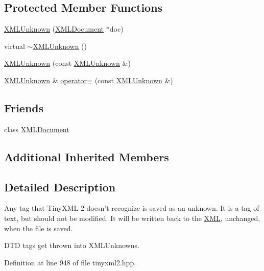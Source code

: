 \subsection*{Protected Member Functions}
\begin{DoxyCompactItemize}
\item 
\hyperlink{classtinyxml2_1_1_x_m_l_unknown_a9391eb679598d50baba424e6f1aa367b}{X\-M\-L\-Unknown} (\hyperlink{classtinyxml2_1_1_x_m_l_document}{X\-M\-L\-Document} $\ast$doc)
\item 
virtual \hyperlink{classtinyxml2_1_1_x_m_l_unknown_a86fcd722ca173a7f385bafafa879f26e}{$\sim$\-X\-M\-L\-Unknown} ()
\item 
\hyperlink{classtinyxml2_1_1_x_m_l_unknown_aab31a93c95a7cedc9597cea7caffa73f}{X\-M\-L\-Unknown} (const \hyperlink{classtinyxml2_1_1_x_m_l_unknown}{X\-M\-L\-Unknown} \&)
\item 
\hyperlink{classtinyxml2_1_1_x_m_l_unknown}{X\-M\-L\-Unknown} \& \hyperlink{classtinyxml2_1_1_x_m_l_unknown_a6137d5611db42c35de3d869f66555e5b}{operator=} (const \hyperlink{classtinyxml2_1_1_x_m_l_unknown}{X\-M\-L\-Unknown} \&)
\end{DoxyCompactItemize}
\subsection*{Friends}
\begin{DoxyCompactItemize}
\item 
class \hyperlink{classtinyxml2_1_1_x_m_l_unknown_a4eee3bda60c60a30e4e8cd4ea91c4c6e}{X\-M\-L\-Document}
\end{DoxyCompactItemize}
\subsection*{Additional Inherited Members}


\subsection{Detailed Description}
Any tag that Tiny\-X\-M\-L-\/2 doesn't recognize is saved as an unknown. It is a tag of text, but should not be modified. It will be written back to the \hyperlink{namespace_x_m_l}{X\-M\-L}, unchanged, when the file is saved.

D\-T\-D tags get thrown into X\-M\-L\-Unknowns. 

Definition at line 948 of file tinyxml2.\-hpp.



